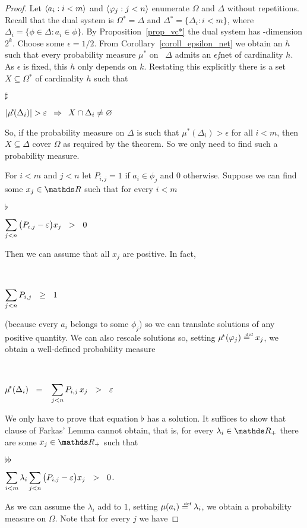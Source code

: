 \documentclass[creche.tex]{subfiles}
\begin{document}
\begin{proof}
Let $\langle a_i:i<m\rangle$ and $\langle\varphi_j:j<n\rangle$ enumerate $\Omega$ and $\Delta$ without repetitions. Recall that the dual system is $\Omega\!^*=\Delta$ and $\Delta\!^{*}\!=\big\{\Delta_i: i<m\big\}$, where $\Delta_i=\big\{\phi\in\Delta: a_i\in\phi\big\}$. By Proposition~\ref{prop_vc*} the dual system has \vc-dimension $2^k$. Choose some $\epsilon=1/2$. From Corollary~\ref{coroll_epsilon_net} we obtain an $h$ such that every probability measure $\mu\!^*$ on \ $\Delta$ admits an $\epsilon\jj$net of cardinality $h$. As $\epsilon$ is fixed, this $h$ only depends on $k$. Restating this explicitly there is a set $X\subseteq\Omega\!^*$ of cardinality $h$ such that

\parbox{10ex}{$\sharp$}
$\displaystyle\left|\mu\!^*\!(\Delta_i)\right|>\epsilon\medrel{\IMP}X\cap\Delta_i\neq\0$

So, if the probability measure on $\Delta$ is such that $\mu\!^*\!(\Delta_i)>\epsilon$ for all $i<m$, then $X\subseteq\Delta$ cover $\Omega$ as required by the theorem. So we only need to find such a probability measure.

For $i<m$ and $j<n$ let $P_{i,j}=1$ if $a_i\in\phi_j$ and $0$ otherwise. Suppose we can find some $x_j\in\RR$ such that for every $i<m$

\parbox{10ex}{$\flat$}
$\displaystyle\sum_{j<n}\big(P_{i,j}-\epsilon\big)x_j\medrel{>}0$

Then we can assume that all $x_j$ are positive. In fact,

\parbox{10ex}{~}
$\displaystyle\sum_{j<n}P_{i,j}\medrel{\ge}1$

(because every $a_i$ belongs to some $\phi_j$) so we can translate solutions of any positive quantity. We can also rescale solutions so, setting $\mu\!^*(\phi_j)\deq x_j$, we obtain a well-defined probability measure

\parbox{10ex}{~}
$\displaystyle\mu\!^*(\Delta_i)\medrel{=}\sum_{j<n}P_{i,j}\,x_j\medrel{>}\epsilon$

We only have to prove that equation $\flat$ has a solution. It suffices to show that clause  of Farkas' Lemma cannot obtain, that is, for every $\lambda_i\in\RR_+$ there are some $x_j\in\RR_+$ such that

\parbox{10ex}{$\flat\flat$}
$\displaystyle\sum_{i<m}\lambda_i\sum_{j<n}\big(P_{i,j}-\epsilon\big)x_j\medrel{>}0$.

As we can assume the $\lambda_i$ add to $1$, setting $\mu(a_i)\deq\lambda_i$, we obtain a probability measure on $\Omega$. Note that for every $j$ we have


\end{proof}
\end{document}
